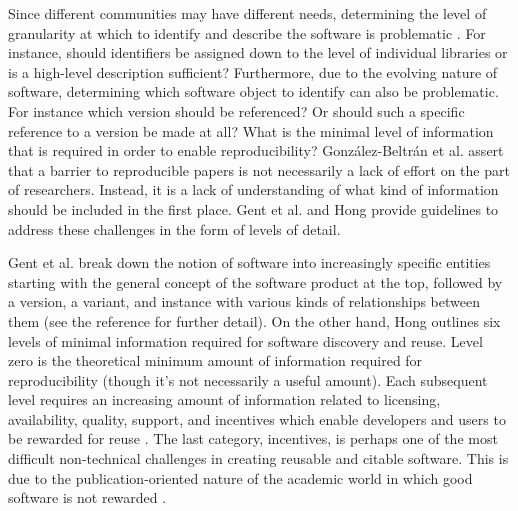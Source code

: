 \documentclass[letterpaper,11pt]{article}
\begin{document}
Since different communities may have different needs, determining the level of granularity at which to identify and describe the software is problematic \citep{jackson2012,gent2015}. For instance, should identifiers be assigned down to the level of individual libraries or is a high-level description sufficient? Furthermore, due to the evolving nature of software, determining which software object to identify can also be problematic. For instance which version should be referenced? Or should such a specific reference to a version be made at all? What is the minimal level of information that is required in order to enable reproducibility? Gonz\'alez-Beltr\'an et al. \citep{gonzalez-beltran2015} assert that a barrier to reproducible papers is not necessarily a lack of effort on the part of researchers. Instead, it is a lack of understanding of what kind of information should be included in the first place. Gent et al. \citep{gent2015} and Hong \citep{hong2014} provide guidelines to address these challenges in the form of levels of detail. 

Gent et al. \citep{gent2015} break down the notion of software into increasingly specific entities starting with the general concept of the software product at the top, followed by a version, a variant, and instance with various kinds of relationships between them (see the reference for further detail). On the other hand, Hong \citep{hong2014} outlines six levels of minimal information required for software discovery and reuse. Level zero is the theoretical minimum amount of information required for reproducibility (though it’s not necessarily a useful amount).  Each subsequent level requires an increasing amount of information related to licensing, availability, quality, support, and incentives which enable developers and users to be rewarded for reuse \citep{hong2014}. The last category, incentives, is perhaps one of the most difficult non-technical challenges in creating reusable and citable software. This is due to the publication-oriented nature of the academic world in which good software is not rewarded \citep{ahalt2015}. 
\end{document}
